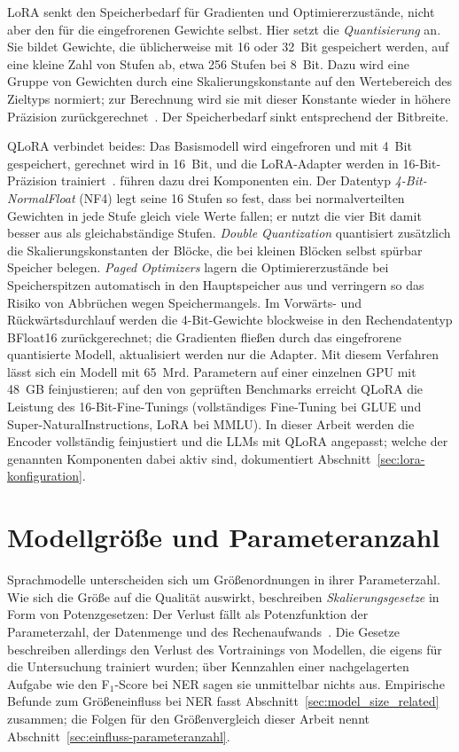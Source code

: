 LoRA senkt den Speicherbedarf für Gradienten und Optimiererzustände,
nicht aber den für die eingefrorenen Gewichte selbst.
Hier setzt die \emph{Quantisierung} an.
Sie bildet Gewichte, die üblicherweise mit 16 oder 32~Bit gespeichert
werden, auf eine kleine Zahl von Stufen ab, etwa 256 Stufen bei 8~Bit.
Dazu wird eine Gruppe von Gewichten durch eine Skalierungskonstante auf
den Wertebereich des Zieltyps normiert; zur Berechnung wird sie
mit dieser Konstante wieder in höhere Präzision
zurückgerechnet~\cite{dettmers2022llmint8}.
Der Speicherbedarf sinkt entsprechend der Bitbreite.

QLoRA verbindet beides: Das Basismodell wird eingefroren und mit 4~Bit
gespeichert, gerechnet wird in 16~Bit, und die LoRA-Adapter werden in
16-Bit-Präzision trainiert~\cite{dettmers2023qlora}.
\textcite{dettmers2023qlora} führen dazu drei Komponenten ein.
Der Datentyp \emph{4-Bit-NormalFloat} (NF4) legt seine 16 Stufen so
fest, dass bei normalverteilten Gewichten in jede Stufe gleich viele
Werte fallen; er nutzt die vier Bit damit besser aus als
gleichabständige Stufen.
\emph{Double Quantization} quantisiert zusätzlich die
Skalierungskonstanten der Blöcke, die bei kleinen Blöcken selbst
spürbar Speicher belegen.
\emph{Paged Optimizers} lagern die Optimiererzustände bei
Speicherspitzen automatisch in den Hauptspeicher aus und verringern so
das Risiko von Abbrüchen wegen Speichermangels.
Im Vorwärts- und Rückwärtsdurchlauf werden die 4-Bit-Gewichte blockweise
in den Rechendatentyp BFloat16 zurückgerechnet; die Gradienten fließen
durch das eingefrorene quantisierte Modell, aktualisiert werden nur die
Adapter.
Mit diesem Verfahren lässt sich ein Modell mit 65~Mrd. Parametern auf
einer einzelnen GPU mit 48~GB feinjustieren; auf den von
\textcite{dettmers2023qlora} geprüften Benchmarks erreicht QLoRA die
Leistung des 16-Bit-Fine-Tunings (vollständiges Fine-Tuning bei GLUE
und Super-NaturalInstructions, LoRA bei MMLU).
In dieser Arbeit werden die Encoder vollständig feinjustiert und die
LLMs mit QLoRA angepasst; welche der genannten Komponenten dabei aktiv
sind, dokumentiert Abschnitt~\ref{sec:lora-konfiguration}.

\clearpage  %
\section{Modellgröße und Parameteranzahl}
\label{sec:model_size}

Sprachmodelle unterscheiden sich um Größenordnungen in ihrer
Parameterzahl.
Wie sich die Größe auf die Qualität auswirkt, beschreiben
\emph{Skalierungsgesetze} in Form von Potenzgesetzen: Der Verlust fällt
als Potenzfunktion der Parameterzahl, der Datenmenge und des
Rechenaufwands~\cite{kaplan2020scaling}.
Die Gesetze beschreiben allerdings den Verlust des Vortrainings von
Modellen, die eigens für die Untersuchung trainiert wurden; über
Kennzahlen einer nachgelagerten Aufgabe wie den F$_1$-Score bei NER
sagen sie unmittelbar nichts aus.
Empirische Befunde zum Größeneinfluss bei NER fasst
Abschnitt~\ref{sec:model_size_related} zusammen; die Folgen für den
Größenvergleich dieser Arbeit nennt
Abschnitt~\ref{sec:einfluss-parameteranzahl}.


